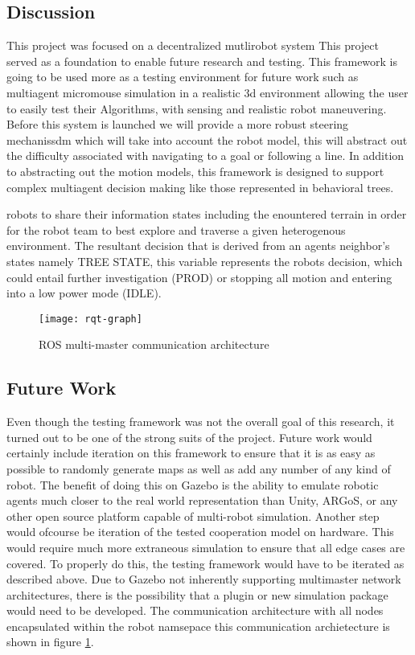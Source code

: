 \subsection{Discussion}

This project was focused on a decentralized mutlirobot system
This project served as a foundation to enable future research and testing.
This framework is going to be used more as a testing environment for future work such
as multiagent micromouse simulation in a realistic 3d environment allowing the user to easily test
their Algorithms, with sensing and realistic robot maneuvering. Before this system is launched
we will provide a more robust steering mechanissdm which will take into account the robot model,
this will abstract out the difficulty associated with navigating to a goal or following a line.
In addition to abstracting out the motion models, this framework is designed to support complex
multiagent decision making like those represented in behavioral trees.

robots to share their information states including the enountered
terrain in order for the robot team to best explore and traverse a
given heterogenous environment. The resultant decision that is derived
from an agents neighbor's states namely TREE STATE, this variable
represents the robots decision, which could entail further investigation
(PROD) or stopping all motion and entering into a low power mode (IDLE).

\begin{figure}[H]
  \centering
    \texttt{[image: rqt-graph]}
  \caption{ROS multi-master communication architecture}
  \label{fig:comm}
\end{figure}


\subsection{Future Work}
Even though the testing framework was not the overall goal of this research,
it turned out to be one of the strong suits of the project. Future work would certainly
include iteration on this framework to ensure that it is as easy as possible to
randomly generate maps as well as add any number of any kind of robot. The benefit
of doing this on Gazebo is the ability to emulate robotic agents much closer to the
real world representation than Unity, ARGoS, or any other open source platform
capable of multi-robot simulation. Another step would ofcourse be iteration of the tested cooperation model on hardware.
This would require much more extraneous simulation to ensure that all edge cases are
covered. To properly do this, the testing framework would have to be iterated as
described above. Due to Gazebo not inherently supporting multimaster network architectures,
there is the possibility that a plugin or new simulation package would need to be
developed.\cite{ROS-mm} The communication architecture with all nodes encapsulated within the robot namsepace
this communication archietecture is shown in figure \ref{fig:comm}.
